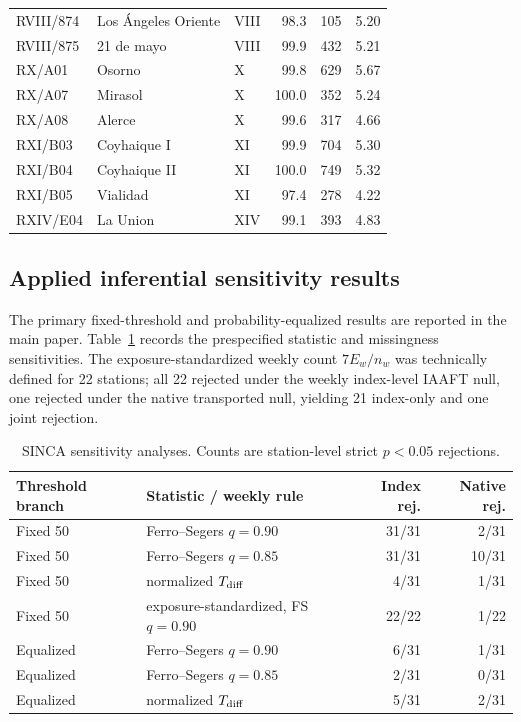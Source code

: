 \documentclass[11pt]{article}
\begin{document}
\begin{longtable}{lllrrr}
RVIII/874 & Los Ángeles Oriente & VIII & 98.3 & 105 & 5.20 \\
RVIII/875 & 21 de mayo & VIII & 99.9 & 432 & 5.21 \\
RX/A01 & Osorno & X & 99.8 & 629 & 5.67 \\
RX/A07 & Mirasol & X & 100.0 & 352 & 5.24 \\
RX/A08 & Alerce & X & 99.6 & 317 & 4.66 \\
RXI/B03 & Coyhaique I & XI & 99.9 & 704 & 5.30 \\
RXI/B04 & Coyhaique II & XI & 100.0 & 749 & 5.32 \\
RXI/B05 & Vialidad & XI & 97.4 & 278 & 4.22 \\
RXIV/E04 & La Union & XIV & 99.1 & 393 & 4.83 \\
\bottomrule
\end{longtable}
\normalsize

\subsection{Applied inferential sensitivity results}
The primary fixed-threshold and probability-equalized results are reported in the main paper. Table~\ref{tab:sincasens} records the prespecified statistic and missingness sensitivities. The exposure-standardized weekly count $7E_w/n_w$ was technically defined for 22 stations; all 22 rejected under the weekly index-level IAAFT null, one rejected under the native transported null, yielding 21 index-only and one joint rejection.

\begin{table}[ht]
\centering
\caption{SINCA sensitivity analyses. Counts are station-level strict $p<0.05$ rejections.}\label{tab:sincasens}
\begin{tabular}{llrr}
\toprule
Threshold branch & Statistic / weekly rule & Index rej. & Native rej.\\
\midrule
Fixed 50 & Ferro--Segers $q=0.90$ & 31/31 & 2/31\\
Fixed 50 & Ferro--Segers $q=0.85$ & 31/31 & 10/31\\
Fixed 50 & normalized $T_{\rm diff}$ & 4/31 & 1/31\\
Fixed 50 & exposure-standardized, FS $q=0.90$ & 22/22 & 1/22\\
Equalized & Ferro--Segers $q=0.90$ & 6/31 & 1/31\\
Equalized & Ferro--Segers $q=0.85$ & 2/31 & 0/31\\
Equalized & normalized $T_{\rm diff}$ & 5/31 & 2/31\\
\bottomrule
\end{tabular}
\end{table}
\end{document}
